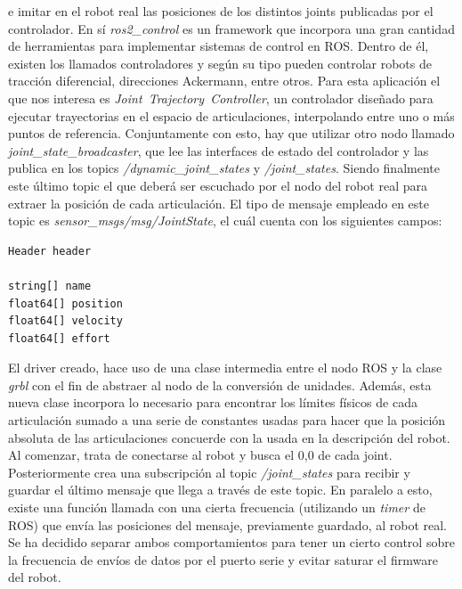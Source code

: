 e imitar en el robot real las posiciones de los distintos joints publicadas por el controlador. En sí \mbox{\textit{ros2\_control}} es un 
framework que incorpora una gran cantidad de herramientas para implementar sistemas de control en ROS. Dentro de él, existen los llamados 
controladores y según su tipo pueden controlar robots de tracción diferencial, direcciones Ackermann, entre otros. Para esta aplicación el que nos 
interesa es \mbox{\textit{Joint Trajectory Controller}}, un controlador diseñado para ejecutar trayectorias en el espacio de 
articulaciones, interpolando entre uno o más puntos de referencia. Conjuntamente con esto, hay que 
utilizar otro nodo llamado \textit{joint\_state\_broadcaster}, que lee las interfaces de estado del controlador y las publica en los topics
\textit{/dynamic\_joint\_states} y \textit{/joint\_states}. Siendo finalmente este último topic el que deberá ser escuchado por el 
nodo del robot real para extraer la posición 
de cada articulación. El tipo de mensaje empleado en este topic es \mbox{\textit{sensor\_msgs/msg/JointState}}, el
cuál cuenta con los siguientes campos:

\begin{lstlisting}
Header header

string[] name
float64[] position
float64[] velocity
float64[] effort
\end{lstlisting}


El driver creado, hace uso de una clase intermedia entre el nodo ROS y la clase \textit{grbl} con el fin de abstraer al nodo de la conversión 
de unidades. Además, esta nueva clase incorpora lo necesario para encontrar los límites físicos de cada articulación sumado a una serie de 
constantes usadas para hacer que la posición absoluta de las articulaciones concuerde con la usada en la descripción del robot. \\

Al comenzar, trata 
de conectarse al robot y busca el 0,0 de cada joint. Posteriormente crea una subscripción al topic \textit{/joint\_states} para recibir y 
guardar el último mensaje que llega a través de  este topic. En paralelo a esto, existe una función llamada con una cierta frecuencia (utilizando un 
\textit{timer} de ROS) que envía las posiciones del mensaje, previamente guardado, al robot real. Se ha decidido separar ambos comportamientos 
para tener un cierto control sobre la frecuencia de envíos de datos por el puerto serie y evitar saturar el firmware del robot. 

